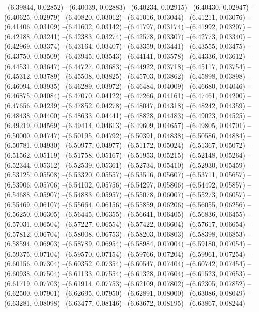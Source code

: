 --(6.39844, 0.02852)
--(6.40039, 0.02883)
--(6.40234, 0.02915)
--(6.40430, 0.02947)
--(6.40625, 0.02979)
--(6.40820, 0.03012)
--(6.41016, 0.03044)
--(6.41211, 0.03076)
--(6.41406, 0.03109)
--(6.41602, 0.03142)
--(6.41797, 0.03174)
--(6.41992, 0.03207)
--(6.42188, 0.03241)
--(6.42383, 0.03274)
--(6.42578, 0.03307)
--(6.42773, 0.03340)
--(6.42969, 0.03374)
--(6.43164, 0.03407)
--(6.43359, 0.03441)
--(6.43555, 0.03475)
--(6.43750, 0.03509)
--(6.43945, 0.03543)
--(6.44141, 0.03578)
--(6.44336, 0.03612)
--(6.44531, 0.03647)
--(6.44727, 0.03683)
--(6.44922, 0.03718)
--(6.45117, 0.03754)
--(6.45312, 0.03789)
--(6.45508, 0.03825)
--(6.45703, 0.03862)
--(6.45898, 0.03898)
--(6.46094, 0.03935)
--(6.46289, 0.03972)
--(6.46484, 0.04009)
--(6.46680, 0.04046)
--(6.46875, 0.04084)
--(6.47070, 0.04122)
--(6.47266, 0.04161)
--(6.47461, 0.04200)
--(6.47656, 0.04239)
--(6.47852, 0.04278)
--(6.48047, 0.04318)
--(6.48242, 0.04359)
--(6.48438, 0.04400)
--(6.48633, 0.04441)
--(6.48828, 0.04483)
--(6.49023, 0.04525)
--(6.49219, 0.04569)
--(6.49414, 0.04613)
--(6.49609, 0.04657)
--(6.49805, 0.04701)
--(6.50000, 0.04747)
--(6.50195, 0.04792)
--(6.50391, 0.04838)
--(6.50586, 0.04884)
--(6.50781, 0.04930)
--(6.50977, 0.04977)
--(6.51172, 0.05024)
--(6.51367, 0.05072)
--(6.51562, 0.05119)
--(6.51758, 0.05167)
--(6.51953, 0.05215)
--(6.52148, 0.05264)
--(6.52344, 0.05312)
--(6.52539, 0.05361)
--(6.52734, 0.05410)
--(6.52930, 0.05459)
--(6.53125, 0.05508)
--(6.53320, 0.05557)
--(6.53516, 0.05607)
--(6.53711, 0.05657)
--(6.53906, 0.05706)
--(6.54102, 0.05756)
--(6.54297, 0.05806)
--(6.54492, 0.05857)
--(6.54688, 0.05907)
--(6.54883, 0.05957)
--(6.55078, 0.06007)
--(6.55273, 0.06057)
--(6.55469, 0.06107)
--(6.55664, 0.06156)
--(6.55859, 0.06206)
--(6.56055, 0.06256)
--(6.56250, 0.06305)
--(6.56445, 0.06355)
--(6.56641, 0.06405)
--(6.56836, 0.06455)
--(6.57031, 0.06504)
--(6.57227, 0.06554)
--(6.57422, 0.06604)
--(6.57617, 0.06654)
--(6.57812, 0.06704)
--(6.58008, 0.06753)
--(6.58203, 0.06803)
--(6.58398, 0.06853)
--(6.58594, 0.06903)
--(6.58789, 0.06954)
--(6.58984, 0.07004)
--(6.59180, 0.07054)
--(6.59375, 0.07104)
--(6.59570, 0.07154)
--(6.59766, 0.07204)
--(6.59961, 0.07254)
--(6.60156, 0.07304)
--(6.60352, 0.07354)
--(6.60547, 0.07404)
--(6.60742, 0.07454)
--(6.60938, 0.07504)
--(6.61133, 0.07554)
--(6.61328, 0.07604)
--(6.61523, 0.07653)
--(6.61719, 0.07703)
--(6.61914, 0.07753)
--(6.62109, 0.07802)
--(6.62305, 0.07852)
--(6.62500, 0.07901)
--(6.62695, 0.07950)
--(6.62891, 0.08000)
--(6.63086, 0.08049)
--(6.63281, 0.08098)
--(6.63477, 0.08146)
--(6.63672, 0.08195)
--(6.63867, 0.08244)
